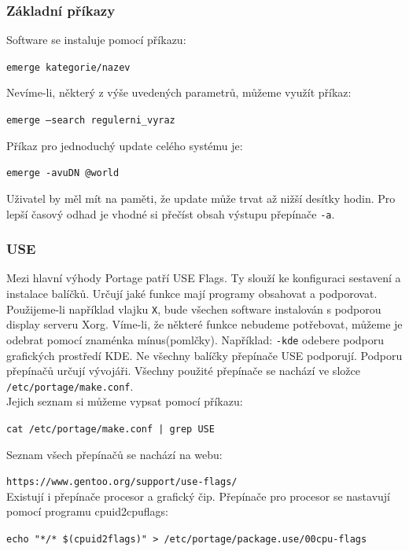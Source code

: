 \documentclass[12pt,a4paper,twoside,]{article}
\begin{document}
{{{{{{{\subsubsection{\textsf{Základní příkazy}}
Software se instaluje pomocí příkazu:  

 \texttt{emerge kategorie/nazev} 
 
\hspace{-1.5em}Nevíme-li, některý z výše uvedených parametrů, můžeme využít příkaz:

\texttt{emerge --search regulerni\_vyraz} 

\hspace{-1.5em}Příkaz pro jednoduchý update celého systému je:

\texttt{emerge -avuDN @world}

Uživatel by měl mít na paměti, že update může trvat až nižší desítky hodin. Pro lepší časový odhad je vhodné si přečíst obsah výstupu přepínače \texttt{-a}. %

\subsubsection{\textsf{USE}}
Mezi hlavní výhody Portage patří USE Flags. Ty slouží ke konfiguraci sestavení a instalace balíčků. Určují jaké funkce mají programy obsahovat a podporovat.\\
Použijeme-li například vlajku \texttt{X}, bude všechen software instalován s podporou display serveru Xorg. Víme-li, že některé funkce nebudeme potřebovat, můžeme je odebrat pomocí znaménka mínus(pomlčky). Například: \texttt{-kde} odebere podporu grafických prostředí KDE.
Ne všechny balíčky přepínače USE podporují. Podporu přepínačů určují vývojáři.
Všechny použité přepínače se nachází ve složce \texttt{/etc/portage/make.conf}. \\
Jejich seznam si můžeme vypsat pomocí příkazu:

\texttt{cat /etc/portage/make.conf | grep USE}

\hspace{-1.5em}Seznam všech přepínačů se nachází na webu:

\texttt{https://www.gentoo.org/support/use-flags/}\\

\hspace{-1.5em}Existují i přepínače procesor a grafický čip. Přepínače pro procesor se nastavují pomocí programu cpuid2cpuflags:


\texttt{echo "*/* \$(cpuid2flags)" > /etc/portage/package.use/00cpu-flags}\\

}}}}}}}
\end{document}

